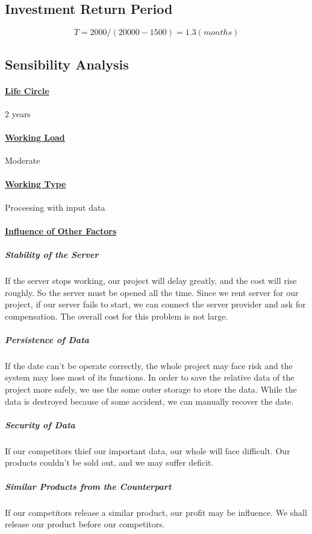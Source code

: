 \documentclass[10pt]{article}
\begin{document}
\subsection{Investment Return Period}

$$T=2000 / (20000 - 1500) = 1.3 (months)$$

\subsection{Sensibility Analysis}
\paragraph{\underline{Life Circle}} 2 years

\paragraph{\underline{Working Load}} Moderate

\paragraph{\underline{Working Type}} Proceesing with input data

\paragraph{\underline{Influence of Other Factors}} \subparagraph{Stability of the Server}
If the server stops working, our project will delay greatly, and the cost will rise roughly.  So the server must be opened all the time. Since we rent server for our project, if our server fails to start, we can connect the server provider and ask for compensation. The overall cost for this problem is not large.

\subparagraph{Persistence of Data}
If the date can’t be operate correctly, the whole project may face risk and the system may lose most of its functions. In order to save the relative data of the project more safely, we use the some outer storage to store the data. While the data is destroyed because of some accident, we can manually recover the date.

\subparagraph{Security of Data}
If our competitors thief our important data, our whole will face difficult. Our products couldn’t be sold out, and we may suffer deficit. 

\subparagraph{Similar Products from the Counterpart}
If our competitors release a similar product, our profit may be influence. We shall release our product before our competitors. 
\end{document}
